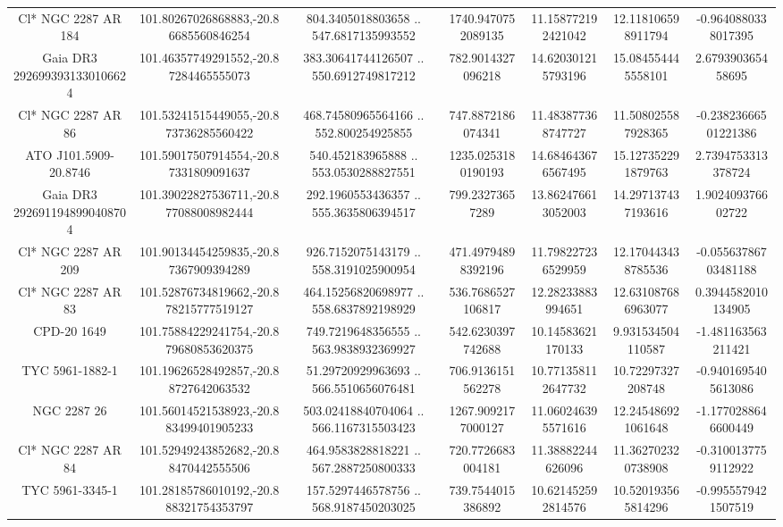 \begin{table}
\begin{tabular}{ccccccc}
Cl* NGC 2287     AR     184 & 101.80267026868883,-20.86685560846254 & 804.3405018803658 .. 547.6817135993552 & 1740.9470752089135 & 11.158772192421042 & 12.118106598911794 & -0.9640880338017395 \\
Gaia DR3 2926993931330106624 & 101.46357749291552,-20.87284465555073 & 383.30641744126507 .. 550.6912749817212 & 782.9014327096218 & 14.620301215793196 & 15.084554445558101 & 2.679390365458695 \\
Cl* NGC 2287     AR      86 & 101.53241515449055,-20.873736285560422 & 468.74580965564166 .. 552.800254925855 & 747.8872186074341 & 11.483877368747727 & 11.508025587928365 & -0.23823666501221386 \\
ATO J101.5909-20.8746 & 101.59017507914554,-20.87331809091637 & 540.452183965888 .. 553.0530288827551 & 1235.0253180190193 & 14.684643676567495 & 15.127352291879763 & 2.7394753313378724 \\
Gaia DR3 2926911948990408704 & 101.39022827536711,-20.877088008982444 & 292.1960553436357 .. 555.3635806394517 & 799.23273657289 & 13.862476613052003 & 14.297137437193616 & 1.902409376602722 \\
Cl* NGC 2287     AR     209 & 101.90134454259835,-20.87367909394289 & 926.7152075143179 .. 558.3191025900954 & 471.49794898392196 & 11.798227236529959 & 12.170443438785536 & -0.05563786703481188 \\
Cl* NGC 2287     AR      83 & 101.52876734819662,-20.878215777519127 & 464.15256820698977 .. 558.6837892198929 & 536.7686527106817 & 12.28233883994651 & 12.631087686963077 & 0.3944582010134905 \\
CPD-20  1649 & 101.75884229241754,-20.879680853620375 & 749.7219648356555 .. 563.9838932369927 & 542.6230397742688 & 10.14583621170133 & 9.931534504110587 & -1.481163563211421 \\
TYC 5961-1882-1 & 101.19626528492857,-20.88727642063532 & 51.29720929963693 .. 566.5510656076481 & 706.9136151562278 & 10.771358112647732 & 10.72297327208748 & -0.9401695405613086 \\
NGC  2287    26 & 101.56014521538923,-20.883499401905233 & 503.02418840704064 .. 566.1167315503423 & 1267.9092177000127 & 11.060246395571616 & 12.245486921061648 & -1.1770288646600449 \\
Cl* NGC 2287     AR      84 & 101.52949243852682,-20.88470442555506 & 464.9583828818221 .. 567.2887250800333 & 720.7726683004181 & 11.38882244626096 & 11.362702320738908 & -0.3100137759112922 \\
TYC 5961-3345-1 & 101.28185786010192,-20.888321754353797 & 157.5297446578756 .. 568.9187450203025 & 739.7544015386892 & 10.621452592814576 & 10.520193565814296 & -0.9955579421507519 \\

\end{tabular}
\end{table}
